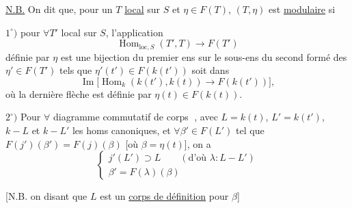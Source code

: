 \uline{N.B.} On dit que, pour un $T$ \uline{local} sur $S$ et $\eta\in F(T)$, $(T,\eta)$ est \uline{modulaire}  si

$1^\circ)$ pour $\forall T'$ local sur $S$, l'application
\[
\operatorname{Hom}_{\mathrm{loc},S}(T',T)\longrightarrow F(T')
\]
définie par $\eta$ est une  bijection du premier ens sur le sous-ens du second formé des $\eta'\in F(T')$ tels que $\eta'(t')\in F(k(t'))$ soit dans
\[
\operatorname{Im}\bigl[\operatorname{Hom}_k(k(t'),k(t))\longrightarrow F(k(t'))\bigr],
\]
où la dernière flèche est définie par $\eta(t)\in F(k(t))$.


$2^\circ)$ Pour $\forall$ diagramme commutatif de corps \textcircled{}, avec $L=k(t)$, $L'=k(t')$, $k\mathbin{-}L$ et $k\mathbin{-}L'$ les homs canoniques, et $\forall\beta'\in F(L')$ tel que $F(j')(\beta')=F(j)(\beta)$ [où $\beta=\eta(t)$], on a
\[
\left\{\begin{array}{l}
j'(L')\supset L\qquad(\text{d'où }\lambda:L\mathbin{-}L')\\
\beta'=F(\lambda)(\beta)
\end{array}\right.
\]

[N.B. on   disant que $L$ est un \uline{corps de définition} pour $\beta$]
